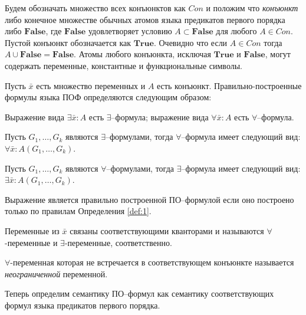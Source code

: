 Будем обозначать множество всех конъюнктов как $Con$ и положим что {\em конъюнкт} либо конечное множестве обычных атомов языка предикатов первого порядка либо $\boldsymbol{False}$, где $\boldsymbol{False}$ удовлетворяет условию $A \subset \boldsymbol{False} $ для любого $A \in Con$. Пустой конъюнкт обозначается как $\boldsymbol{True}$. Очевидно что если $A \in Con$ тогда $A \cup \boldsymbol{False} = \boldsymbol{False}$. Атомы любого конъюнкта, исключая $\boldsymbol{True}$ и $\boldsymbol{False}$, могут содержать переменные, константные и функциональные символы.

\begin{definition}\label{def:1}
Пусть $\bar{x}$ есть множество переменных и $A$ есть конъюнкт. Правильно-построенные формулы языка ПОФ определяются следующим образом:

Выражение вида $\exists \bar{x}\colon A$ есть $\exists$--формула; выражение вида $\forall \bar{x}\colon A$ есть $\forall$--формула.

Пусть $G_1,\ldots,G_k$ являются $\exists$--формулами, тогда $\forall$--формула имеет следующий вид: $\forall \bar{x}\colon A\left(G_1,\ldots,G_k\right)$.

Пусть $G_1,\ldots,G_k$ являются $\forall$--формулами, тогда $\exists$--формула имеет следующий вид: $\exists \bar{x}\colon A\left(G_1,\ldots,G_k\right)$.

\end{definition}

Выражение является правильно построенной ПО--формулой если оно построено только по правилам Определения \ref{def:1}.

Переменные из $\bar{x}$ связаны соответствующими кванторами и называются $\forall$-переменные и $\exists$-переменные, соответственно.

$\forall$-переменная которая не встречается в соответствующем конъюнкте называется {\em неограниченной} переменной.

Теперь определим семантику ПО--формул как семантику соответствующих формул языка предикатов первого порядка.

